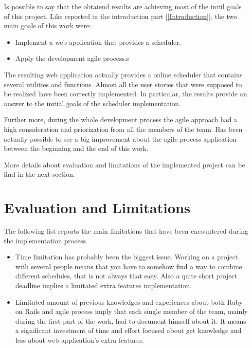 Is possible to say that the obtaiend results are achieving most of the initil goals of this project. 
Like reported in the introduction part [\ref{Introduction}], the two main goals of this work were: 
\vspace{-5mm}
\begin{itemize}
 \setlength{\itemsep}{-5pt}
 \item Implement a web application that provides a scheduler.
 \item Apply the development agile process.s
\end{itemize}

The resulting web application actually provides a online scheduler that contains several utilities and functions. Almost all the user stories that were supposed to be realized have been correctly implemented. In particular, the results provide an answer to the initial goals of the scheduler implementation. 

Further more, during the whole development process the agile approach had a high consideration and priorization from all the members of the team. Has been actually possible to see a big improvement about the agile process application between the beginning and the end of this work.

More details about evaluation and limitations of the implemented project can be find in the next section.
\section{Evaluation and Limitations}
\vspace{-5mm}
\label{Evaluation}
The following list reports the main limitations that have been encountered during the implementation process.
\vspace{-5mm}
\begin{itemize}
 \setlength{\itemsep}{-5pt}
\item Time limitation has probably been the biggest issue. Working on a project with several people means that you have to somehow find a way to combine different schedules, that is not always that easy. Also a quite short project deadline implies a limitated extra features implementation.
\item Limitated amount of previous knowledges and experiences about both Ruby on Rails and agile process imply that each single member of the team, mainly during the first part of the work, had to document himself about it. It means a significant investment of time and effort focused about get knowledge and less about web application's extra features. 
\end{itemize}

